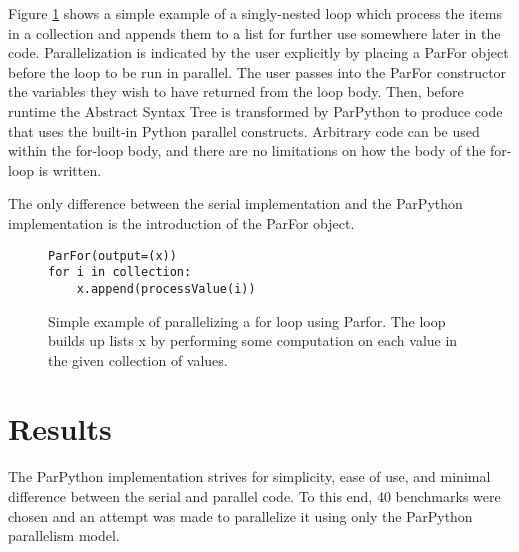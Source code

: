 \documentclass[conference]{IEEEtran}
\begin{document}
Figure \ref{basicExample} shows a simple example of a singly-nested loop
which process the items in a collection and appends them to a list for 
further use somewhere later in the code.
Parallelization is indicated by the user explicitly by placing a ParFor 
object before the loop to be run in parallel.
The user passes into the ParFor constructor the variables they wish to have returned from the loop body.
Then, before runtime the Abstract Syntax Tree is transformed by ParPython
to produce code that uses the built-in Python parallel constructs.
Arbitrary code can be used within the for-loop body, and there are no
limitations on how the body of the for-loop is written.




The only difference between the serial implementation and the ParPython implementation is the introduction of the ParFor object.

\begin{figure}[t]
\begin{lstlisting}[frame=single]
ParFor(output=(x))
for i in collection:
    x.append(processValue(i))
\end{lstlisting}
\caption{Simple example of parallelizing a for loop using Parfor. The loop builds up lists x by performing some computation on each value in the given collection of values.}
\label{basicExample}
\end{figure}

\section{Results}

The ParPython implementation strives for simplicity, ease of use, and minimal difference between the serial and parallel code.
To this end, 40 benchmarks were chosen and an attempt was made to parallelize it using only the ParPython parallelism model.
\end{document}
